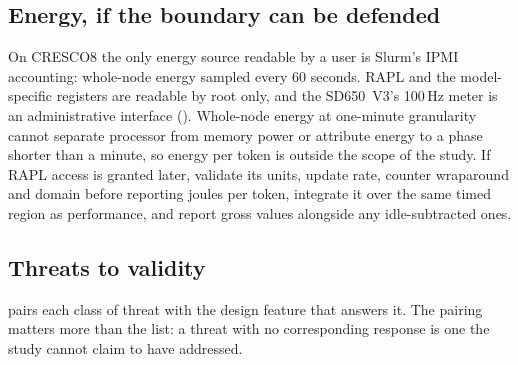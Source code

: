 \subsection{Energy, if the boundary can be defended}

On CRESCO8 the only energy source readable by a user is Slurm's IPMI
accounting: whole-node energy sampled every 60 seconds.  RAPL and the
model-specific registers are readable by root only, and the SD650~V3's
100\,Hz meter is an administrative interface ().
Whole-node energy at one-minute granularity cannot separate processor
from memory power or attribute energy to a phase shorter than a minute,
so energy per token is outside the scope of the study.  If RAPL access
is granted later, validate its units, update rate, counter wraparound and
domain before reporting joules per token, integrate it over the same
timed region as performance, and report gross values alongside any
idle-subtracted ones.

\subsection{Threats to validity}

 pairs each class of threat with the design
feature that answers it.  The pairing matters more than the list: a
threat with no corresponding response is one the study cannot claim to
have addressed.

